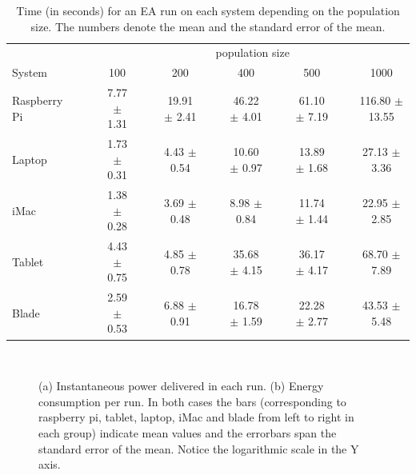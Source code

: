 \begin{table}[!t]
\caption{Time (in seconds) for an EA run on each system depending on the population size. The numbers denote the mean and the standard error of the mean.}
\begin{tabular}{lrcrcrcrcrc}
&&\multicolumn{9}{c}{population size}\\
\cline{3-11}
System 		&~~& 100	&~& 200	&~& 400	&~& 500	&~& 1000\\
\hline
Raspberry Pi	&& 7.77 $\pm$ 1.31	&& 19.91 $\pm$ 2.41	&& 46.22 $\pm$ 4.01	&& 61.10 $\pm$ 7.19	&& 116.80 $\pm$ 13.55	\\
Laptop	&& 1.73 $\pm$ 0.31	&& 4.43 $\pm$ 0.54	&& 10.60 $\pm$ 0.97	&& 13.89 $\pm$ 1.68	&& 27.13 $\pm$ 3.36	\\
iMac	&& 1.38 $\pm$ 0.28	&& 3.69 $\pm$ 0.48	&& 8.98 $\pm$ 0.84	&& 11.74 $\pm$ 1.44	&& 22.95 $\pm$ 2.85	\\
Tablet	&& 4.43 $\pm$ 0.75	&& 4.85 $\pm$ 0.78	&& 35.68 $\pm$ 4.15	&& 36.17 $\pm$ 4.17	&& 68.70 $\pm$ 7.89	\\
Blade	&& 2.59 $\pm$ 0.53	&& 6.88 $\pm$ 0.91	&& 16.78 $\pm$ 1.59	&& 22.28 $\pm$ 2.77	&& 43.53 $\pm$ 5.48	\\
\hline
\end{tabular}
\end{table}

\begin{figure}[!t]
~~
\caption{(a) Instantaneous power delivered in each run. (b) Energy consumption per run. In both cases the bars (corresponding to raspberry pi, tablet, laptop, iMac and blade from left to right in each group) indicate mean values and the errorbars span the standard error of the mean. Notice the logarithmic scale in the Y axis.\label{fig:powerenergy}}
\end{figure}




